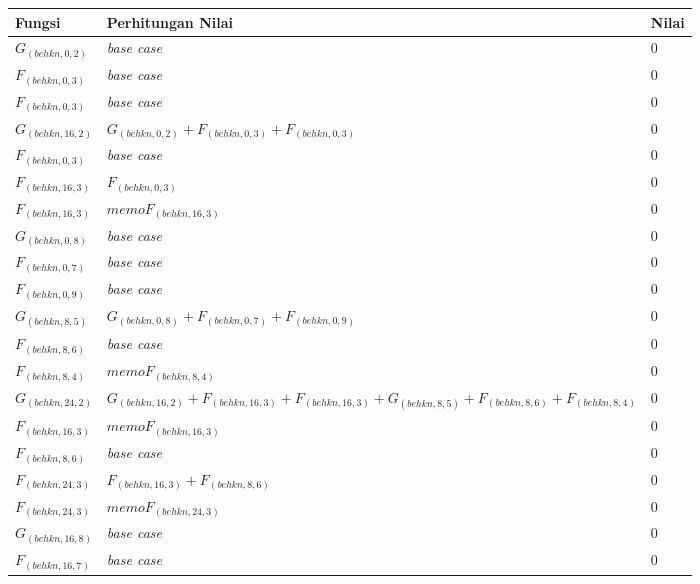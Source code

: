 \begin{appendices}
  \begin{table}[H]
  	\centering
  	\begin{tabular} {|p{3cm}|p{5cm}|p{1cm}|} \hline
  		Fungsi & Perhitungan Nilai & Nilai \\ \hline
  		$ G_{(behkn, 0, 2)} $ & \textit{base case} & $ 0 $ \\ \hline
  		$ F_{(behkn, 0, 3)} $ & \textit{base case} & $ 0 $ \\ \hline
  		$ F_{(behkn, 0, 3)} $ & \textit{base case} & $ 0 $ \\ \hline
  		$ G_{(behkn, 16, 2)}  $ & $G_{(behkn, 0, 2)} + F_{(behkn, 0, 3)} + F_{(behkn, 0, 3)}$ & $ 0 $ \\ \hline
  		$ F_{(behkn, 0, 3)} $ & \textit{base case} & $ 0 $ \\ \hline
  		$ F_{(behkn, 16, 3)}  $ & $F_{(behkn, 0, 3)}$ & $ 0 $ \\ \hline
  		$ F_{(behkn, 16, 3)}  $ & $memoF_{(behkn, 16, 3)}$ & $ 0 $ \\ \hline
  		$ G_{(behkn, 0, 8)} $ & \textit{base case} & $ 0 $ \\ \hline
  		$ F_{(behkn, 0, 7)} $ & \textit{base case} & $ 0 $ \\ \hline
  		$ F_{(behkn, 0, 9)} $ & \textit{base case} & $ 0 $ \\ \hline
  		$ G_{(behkn, 8, 5)}  $ & $G_{(behkn, 0, 8)} + F_{(behkn, 0, 7)} + F_{(behkn, 0, 9)}$ & $ 0 $ \\ \hline
  		$ F_{(behkn, 8, 6)} $ & \textit{base case} & $ 0 $ \\ \hline
  		$ F_{(behkn, 8, 4)}  $ & $memoF_{(behkn, 8, 4)}$ & $ 0 $ \\ \hline
  		$ G_{(behkn, 24, 2)}  $ & $G_{(behkn, 16, 2)} + F_{(behkn, 16, 3)} + F_{(behkn, 16, 3)} + G_{(behkn, 8, 5)} + F_{(behkn, 8, 6)} + F_{(behkn, 8, 4)}$ & $ 0 $ \\ \hline
  		$ F_{(behkn, 16, 3)}  $ & $memoF_{(behkn, 16, 3)}$ & $ 0 $ \\ \hline
  		$ F_{(behkn, 8, 6)} $ & \textit{base case} & $ 0 $ \\ \hline
  		$ F_{(behkn, 24, 3)}  $ & $F_{(behkn, 16, 3)} + F_{(behkn, 8, 6)}$ & $ 0 $ \\ \hline
  		$ F_{(behkn, 24, 3)}  $ & $memoF_{(behkn, 24, 3)}$ & $ 0 $ \\ \hline
  		$ G_{(behkn, 16, 8)} $ & \textit{base case} & $ 0 $ \\ \hline
  		$ F_{(behkn, 16, 7)} $ & \textit{base case} & $ 0 $ \\ \hline

\end{tabular}
\end{table}
\end{appendices}
